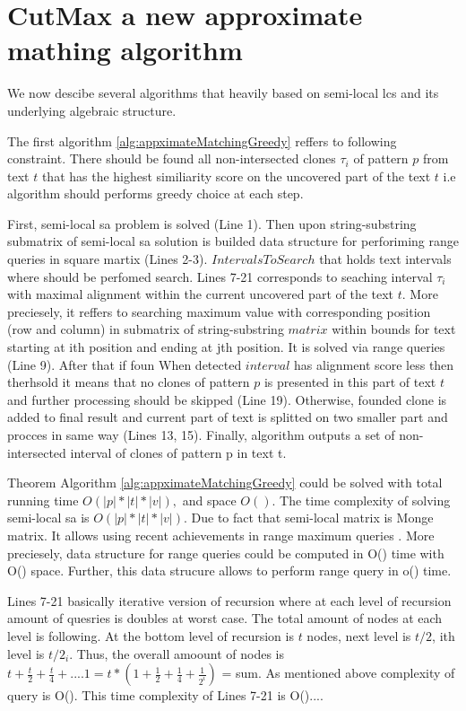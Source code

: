 \section{CutMax a new approximate mathing algorithm}
\label{section:our}
We now descibe several algorithms that heavily based on semi-local lcs and its underlying algebraic structure.

The first algorithm \ref{alg:appximateMatchingGreedy} reffers to following constraint.
There should be found all non-intersected clones $\tau_{i}$ of pattern $p$ from text $t$ that has the highest similiarity score on the uncovered part of the text $t$ i.e algorithm should performs greedy choice at each step.

First, semi-local sa problem is solved (Line 1).
Then upon string-substring submatrix of semi-local sa solution is builded data structure for perforiming range queries in square martix (Lines 2-3).
$IntervalsToSearch$ that holds text intervals where should be perfomed search.
Lines 7-21 corresponds to seaching interval $\tau_{i}$  with maximal alignment within the current uncovered part of the text $t$.
More preciesely, it reffers to searching maximum value with corresponding position (row and column) in submatrix of string-substring $matrix$ within bounds for text starting at ith position and ending at jth position.
It is solved via range queries (Line 9).
After that if foun
When detected $interval$ has alignment score less then therhsold it means that no clones of pattern $p$ is presented in this part of text $t$ and further processing should be skipped (Line 19).
Otherwise, founded clone is added to final result and current part of text is splitted on two smaller part and procces in same way (Lines 13, 15).
Finally,  algorithm outputs a set of non-intersected interval of clones of pattern p in text t.

Theorem
Algorithm \ref{alg:appximateMatchingGreedy} could be solved with total running time $O(|p|*|t|*|v|),$ and space $ O()$.
The time complexity of solving semi-local sa is $O(|p|*|t|*|v|)$.
Due to fact that semi-local matrix is Monge matrix.
It allows using recent achievements in range maximum queries \cite{}.
More preciesely, data structure for  range queries could be computed in O()
time with O() space.
Further, this data strucure allows to perform range query in o() time.

Lines 7-21 basically  iterative version of recursion where at each level of recursion amount of quesries is doubles at worst case.
The total amount of  nodes at each level is following.
At the bottom level of recursion is $t$ nodes, next level is $t/2$, ith level is $t/2_{i}$.
Thus, the overall amoount of nodes is $t+\frac{t}{2}+\frac{t}{4}+....1 = t*(1 + \frac{1}{2} + \frac{1}{4}+\frac{1}{2^{i}}) $ = sum.
As mentioned above complexity of query is O().
This time complexity of Lines 7-21 is O()....

